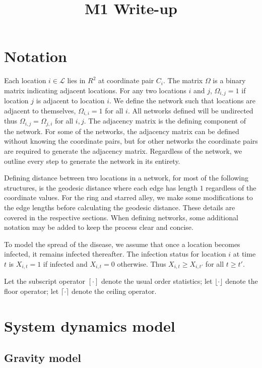 \documentclass[11pt]{article}
\date{}
\title{M1 Write-up}
\begin{document}
\maketitle
\tableofcontents


\section{Notation}
\label{sec-1}

Each location $i \in \mathcal{L}$ lies in $R^2$ at coordinate pair
$C_i$.  The matrix $\Omega$ is a binary matrix indicating adjacent
locations.  For any two locations $i$ and $j$, $\Omega_{i,j} = 1$ if
location $j$ is adjacent to location $i$.  We define the network such
that locations are adjacent to themselves, $\Omega_{i,i} = 1$ for all
$i$.  All networks defined will be undirected thus $\Omega_{i,j} =
  \Omega_{j,i}$ for all $i,j$.  The adjacency matrix is the defining
component of the network.  For some of the networks, the adjacency
matrix can be defined without knowing the coordinate pairs, but for
other networks the coordinate pairs are required to generate the
adjacency matrix.  Regardless of the network, we outline every step to
generate the network in its entirety.

Defining distance between two locations in a network, for most of
the following structures, is the geodesic distance where each edge
has length $1$ regardless of the coordinate values.  For the ring
and starred alley, we make some modifications to the edge lengths
before calculating the geodesic distance.  These details are covered
in the respective sections.  When defining networks, some additional
notation may be added to keep the process clear and concise.

To model the spread of the disease, we assume that once a location
becomes infected, it remains infected thereafter.  The infection
status for location $i$ at time $t$ is $X_{i,t} = 1$ if infected and
$X_{i,t} = 0$ otherwise.  Thus $X_{i,t} \ge X_{i,t'}$ for all $t \ge
  t'$.

Let the subscript operator $[\cdot]$ denote the usual order
statistics; let $\lfloor \cdot \rfloor$ denote the floor operator; let
$\lceil \cdot \rceil$ denote the ceiling operator.


\section{System dynamics model}
\label{sec-2}

\subsection{Gravity model}
\label{sec-2-1}
\end{document}
